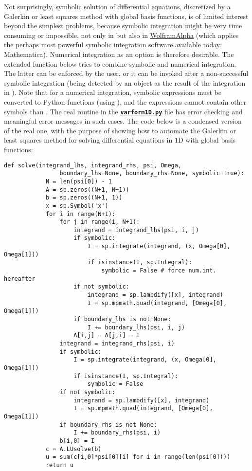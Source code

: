 \documentclass[../main.tex]{subfiles}
\begin{document}
		Not surprisingly, symbolic solution of differential equations, discretized by a Galerkin or least squares method with global basis functions, is of limited interest beyond the simplest problems, because symbolic integration might be very time consuming or impossible, not only in  but also in \href{https://www.wolframalpha.com/}{WolframAlpha} (which applies the perhaps most powerful symbolic integration software available today: Mathematica). Numerical integration as an option is therefore desirable.\smallbreak
		The extended  function below tries to combine symbolic and numerical integration. The latter can be enforced by the user, or it can be invoked after a non-successful symbolic integration (being detected by an  object as the result of the integration in ). Note that for a numerical integration, symbolic expressions must be converted to Python functions (using ), and the expressions cannot contain other symbols than . The real  routine in the \textbf{\texttt{\href{https://github.com/hplgit/INF5620/blob/master/src/fem/varform1D.py}{varform1D.py}}} file has error checking and meaningful error messages in such cases. The  code below is a condensed version of the real one, with the purpose of showing how to automate the Galerkin or least squares method for solving differential equations in $1 \mathrm{D}$ with global basis functions:
		\begin{lstlisting}[numbers=none]
			def solve(integrand_lhs, integrand_rhs, psi, Omega,
				boundary_lhs=None, boundary_rhs=None, symbolic=True):
			N = len(psi[0]) - 1
			A = sp.zeros((N+1, N+1))
			b = sp.zeros((N+1, 1))
			x = sp.Symbol('x')
			for i in range(N+1):
				for j in range(i, N+1):
					integrand = integrand_lhs(psi, i, j)
					if symbolic:
						I = sp.integrate(integrand, (x, Omega[0], Omega[1]))
						if isinstance(I, sp.Integral):
							symbolic = False # force num.int. hereafter
					if not symbolic:
						integrand = sp.lambdify([x], integrand)
						I = sp.mpmath.quad(integrand, [Omega[0], Omega[1]])
					if boundary_lhs is not None:
						I += boundary_lhs(psi, i, j)
					A[i,j] = A[j,i] = I
				integrand = integrand_rhs(psi, i)
				if symbolic:
					I = sp.integrate(integrand, (x, Omega[0], Omega[1]))
					if isinstance(I, sp.Integral):
						symbolic = False
				if not symbolic:
					integrand = sp.lambdify([x], integrand)
					I = sp.mpmath.quad(integrand, [Omega[0], Omega[1]])
				if boundary_rhs is not None:
					I += boundary_rhs(psi, i)
				b[i,0] = I
			c = A.LUsolve(b)
			u = sum(c[i,0]*psi[0][i] for i in range(len(psi[0])))
			return u
		\end{lstlisting}
\end{document}
